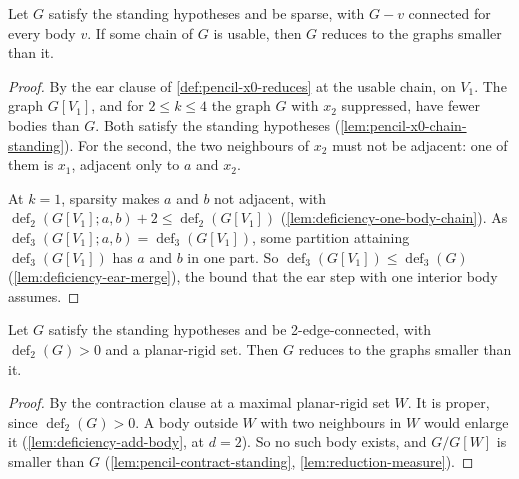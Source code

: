 \begin{lemma}
  \label{lem:pencil-x0-chain-reduces}
  \leanok
  Let $G$ satisfy the standing hypotheses and be sparse, with $G - v$
  connected for every body $v$. If some chain of $G$ is usable, then $G$
  reduces to the graphs smaller than it.
\end{lemma}
\begin{proof}
  \leanok
  By the ear clause of \cref{def:pencil-x0-reduces} at the usable chain,
  on $V_1$. The graph $G[V_1]$, and for $2 \le k \le 4$ the graph $G$
  with $x_2$ suppressed, have fewer bodies than $G$. Both satisfy the
  standing hypotheses (\cref{lem:pencil-x0-chain-standing}). For the
  second, the two neighbours of $x_2$ must not be adjacent: one of them
  is $x_1$, adjacent only to $a$ and $x_2$.

  At $k = 1$, sparsity makes $a$ and $b$ not adjacent, with
  $\operatorname{def}_2(G[V_1]; a, b) + 2 \le
  \operatorname{def}_2(G[V_1])$ (\cref{lem:deficiency-one-body-chain}).
  As $\operatorname{def}_3(G[V_1]; a, b) = \operatorname{def}_3(G[V_1])$,
  some partition attaining $\operatorname{def}_3(G[V_1])$ has $a$ and $b$
  in one part. So $\operatorname{def}_3(G[V_1]) \le
  \operatorname{def}_3(G)$ (\cref{lem:deficiency-ear-merge}), the bound
  that the ear step with one interior body assumes.
\end{proof}

\begin{lemma}
  \label{lem:pencil-x0-planar-rigid-reduces}
  \leanok
  Let $G$ satisfy the standing hypotheses and be 2-edge-connected, with
  $\operatorname{def}_2(G) > 0$ and a planar-rigid set. Then $G$
  reduces to the graphs smaller than it.
\end{lemma}
\begin{proof}
  \leanok
  By the contraction clause at a maximal planar-rigid set $W$. It is
  proper, since $\operatorname{def}_2(G) > 0$. A body outside $W$ with
  two neighbours in $W$ would enlarge it (\cref{lem:deficiency-add-body},
  at $d = 2$). So no such body exists, and $G/G[W]$ is smaller than $G$
  (\cref{lem:pencil-contract-standing}, \cref{lem:reduction-measure}).
\end{proof}

